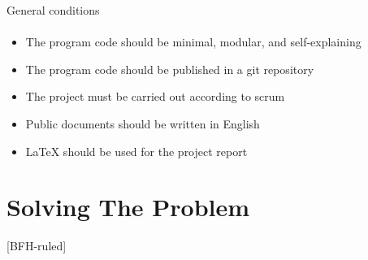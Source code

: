 \documentclass[
    ngerman,%
    authorontitle=true,
]{bfhbeamer}
\begin{document}
    \begin{frame}{General conditions}
        \framesubtitle{}
        \begin{itemize}
            \item The program code should be minimal, modular, and self-explaining
            \item The program code should be published in a git repository
            \item The project must be carried out according to scrum
            \item Public documents should be written in English
            \item LaTeX should be used for the project report
        \end{itemize}
    \end{frame}



    \section{Solving The Problem}
    [BFH-ruled]
    \frame{\sectionpage}
\end{document}
